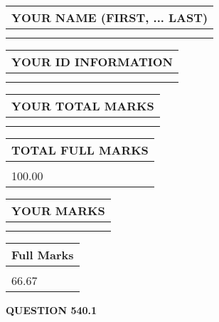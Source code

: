\documentclass{ctexart}
\begin{document}
   
   
   
\newpage 
\setcounter{page}{ 
   540001 } 
   
   
   
   
\noindent\begin{tabular}{|l|}
\hline
YOUR NAME (FIRST, ... LAST)  \\
\hline
 \\ 
 \\ 
\hline
\end{tabular}
\hspace{0.05in} \begin{tabular}{|l|}
\hline
 YOUR   ID   INFORMATION  \\
\hline
 \\ 
 \\ 
\hline
\end{tabular}
   
   
\vspace{0.2in}\noindent\begin{tabular}{|l|}
\hline
YOUR TOTAL MARKS  \\
\hline
 \\ 
 \\ 
\hline
\end{tabular}
\hspace{0.05in} \begin{tabular}{|l|}
\hline
TOTAL FULL MARKS  \\
\hline
 \\ 
100.00 \\
\hline
\end{tabular}
   
   
 \vspace{0.2in}
 
 
 
 
   
   
  
\vspace{0.2in}
  
\noindent\begin{tabular}{|l|}
\hline
 YOUR MARKS  \\
\hline
 \\ 
 \\ 
\hline
\end{tabular}
\hspace{0.05in} \begin{tabular}{|l|}
\hline
 Full Marks  \\
\hline
 \\ 
66.67 \\
\hline
\end{tabular}
{\textbf{\Large{QUESTION
540.1 
}}}
  
\end{document}
